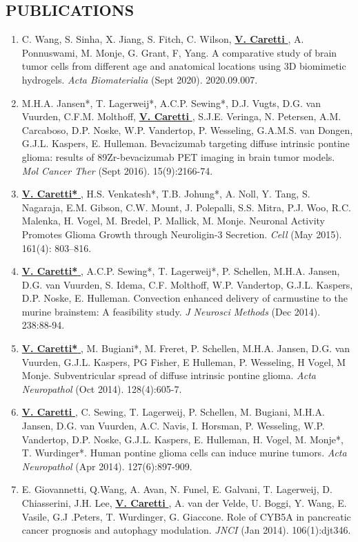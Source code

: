 \documentclass[line,margin]{res}
\newcommand{\namestyle}[1]{\underline{\bf #1 }}
\begin{document}
\begin{resume}
\section{PUBLICATIONS}
\vspace{-0.75pt}
{\footnotesize
\begin{enumerate}
\item C. Wang, S. Sinha, X. Jiang, S. Fitch, C. Wilson, \namestyle{V. Caretti}, A. Ponnuswami, M. Monje, G. Grant, F, Yang. A comparative study of brain tumor cells from different age and anatomical locations using 3D biomimetic hydrogels. \emph{Acta Biomaterialia} (Sept 2020). 2020.09.007.
\item M.H.A. Jansen*, T. Lagerweij*, A.C.P. Sewing*, D.J. Vugts, D.G. van Vuurden, C.F.M. Molthoff, \namestyle{V. Caretti}, S.J.E. Veringa, N. Petersen, A.M. Carcaboso, D.P. Noske, W.P. Vandertop, P. Wesseling, G.A.M.S. van Dongen, G.J.L. Kaspers, E. Hulleman. Bevacizumab targeting diffuse intrinsic pontine glioma: results of 89Zr-bevacizumab PET imaging in brain tumor models. \emph{Mol Cancer Ther} (Sept 2016). 15(9):2166-74.
\item \namestyle{V. Caretti*}, H.S. Venkatesh*, T.B. Johung*, A. Noll, Y. Tang, S. Nagaraja, E.M. Gibson, C.W. Mount, J. Polepalli, S.S. Mitra, P.J. Woo, R.C. Malenka, H. Vogel, M. Bredel, P. Mallick, M. Monje. Neuronal Activity Promotes Glioma Growth through Neuroligin-3 Secretion. \emph{Cell} (May 2015). 161(4): 803–816.
\item \namestyle{V. Caretti*}, A.C.P. Sewing*, T. Lagerweij*, P. Schellen, M.H.A. Jansen, D.G. van Vuurden, S. Idema, C.F. Molthoff, W.P. Vandertop, G.J.L. Kaspers, D.P. Noske, E. Hulleman. Convection enhanced delivery of carmustine to the murine brainstem: A feasibility study. \emph{J Neurosci Methods} (Dec 2014). 238:88-94.
\item \namestyle{V. Caretti*}, M. Bugiani*, M. Freret, P. Schellen, M.H.A. Jansen, D.G. van Vuurden, G.J.L. Kaspers, PG Fisher, E Hulleman, P. Wesseling, H Vogel, M Monje. Subventricular spread of diffuse intrinsic pontine glioma. \emph{Acta Neuropathol} (Oct 2014). 128(4):605-7.
\item \namestyle{V. Caretti}, C. Sewing, T. Lagerweij, P. Schellen, M. Bugiani, M.H.A. Jansen, D.G. van Vuurden, A.C. Navis, I. Horsman, P. Wesseling, W.P. Vandertop, D.P. Noske, G.J.L. Kaspers, E. Hulleman, H. Vogel, M. Monje*, T. Wurdinger*. Human pontine glioma cells can induce murine tumors. \emph{Acta Neuropathol} (Apr 2014). 127(6):897-909.
\item E. Giovannetti, Q.Wang, A. Avan, N. Funel, E. Galvani, T. Lagerweij, D. Chiasserini, J.H. Lee, \namestyle{V. Caretti}, A. van der Velde, U. Boggi, Y. Wang, E. Vasile, G.J .Peters, T. Wurdinger, G. Giaccone. Role of CYB5A in pancreatic cancer prognosis and autophagy modulation. \emph{JNCI} (Jan 2014). 106(1):djt346.

\end{enumerate}}
\end{resume}
\end{document}
